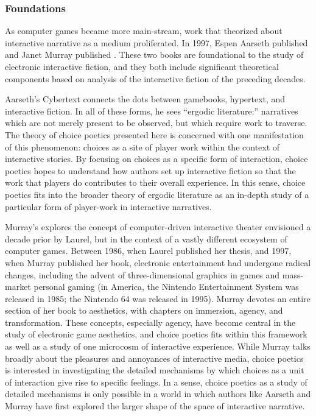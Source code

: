 \subsubsection{Foundations}

As computer games became more main-stream, work that theorized about interactive narrative as a medium proliferated. 
%
In 1997, Espen Aarseth published  and Janet Murray published  \citep{Aarseth1997,Murray1997}.
%
These two books are foundational to the study of electronic interactive fiction, and they both include significant theoretical components based on analysis of the interactive fiction of the preceding decades.


Aarseth's Cybertext connects the dots between gamebooks, hypertext, and interactive fiction.
%
In all of these forms, he sees ``ergodic literature:'' narratives which are not merely present to be observed, but which require work to traverse.
%
The theory of choice poetics presented here is concerned with one manifestation of this phenomenon: choices as a site of player work within the context of interactive stories.
%
By focusing on choices as a specific form of interaction, choice poetics hopes to understand how authors set up interactive fiction so that the work that players do contributes to their overall experience.
%
In this sense, choice poetics fits into the broader theory of ergodic literature as an in-depth study of a particular form of player-work in interactive narratives.


Murray's  explores the concept of computer-driven interactive theater envisioned a decade prior by Laurel, but in the context of a vastly different ecosystem of computer games.
%
Between 1986, when Laurel published her thesis, and 1997, when Murray published her book, electronic entertainment had undergone radical changes, including the advent of three-dimensional graphics in games and mass-market personal gaming (in America, the Nintendo Entertainment System was released in 1985; the Nintendo 64 was released in 1995).
%
Murray devotes an entire section of her book to aesthetics, with chapters on immersion, agency, and transformation.
%
These concepts, especially agency, have become central in the study of electronic game aesthetics, and choice poetics fits within this framework as well as a study of one microcosm of interactive experience.
%
While Murray talks broadly about the pleasures and annoyances of interactive media, choice poetics is interested in investigating the detailed mechanisms by which choices as a unit of interaction give rise to specific feelings.
%
In a sense, choice poetics as a study of detailed mechanisms is only possible in a world in which authors like Aarseth and Murray have first explored the larger shape of the space of interactive narrative.



